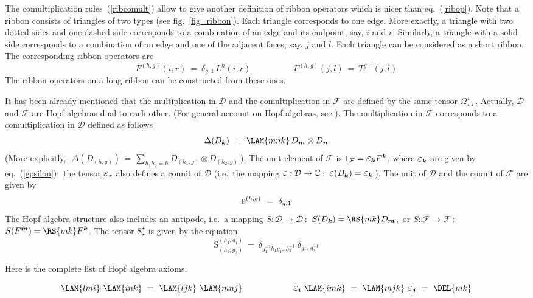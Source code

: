 \documentclass[12pt]{article}
\newcommand{\C}{\mathbb{C}}
\newcommand{\Om}{\Omega}
\newcommand{\Eps}{\mbox{\large$\varepsilon$}}
\newcommand{\rE}{\mbox{\large$\mathrm e$}}
\newcommand{\rS}{\mathrm{S}}
\newcommand{\del}{\delta} %
\newcommand*{\boldind}[1]{{\mbox{\scriptsize\boldmath$#1$}}}
\newcommand*{\RD}[1]{D_\boldind{#1}}
\newcommand*{\RF}[1]{F^\boldind{#1}}
\newcommand*{\EPS}[1]{\Eps_\boldind{#1}}
\newcommand{\calD}{\mathcal{D}}
\newcommand{\calF}{\mathcal{F}}
\begin{document}
The comultiplication rules~(\ref{ribcomult}) allow to give another definition
of ribbon operators which is nicer than eq.~(\ref{ribop}). Note that a ribbon
consists of triangles of two types (see fig.~\ref{fig_ribbon}). Each triangle
corresponds to one edge. More exactly, a triangle with two dotted sides and
one dashed side corresponds to a combination of an edge and its endpoint, say,
$i$ and $r$. Similarly, a triangle with a solid side corresponds to a
combination of an edge and one of the adjacent faces, say, $j$ and
$l$. Each triangle can be considered as a short ribbon. The corresponding
ribbon operators are
\[
  F^{(h,g)}(i,r)\ =\ \del_{g,1}\,L^h(i,r) \qquad\qquad\quad
  F^{(h,g)}(j,l)\ =\ T^{g^{-1}}(j,l)
\]
The ribbon operators on a long ribbon can be constructed from these ones.

It has been already mentioned that the multiplication in $\calD$ and the
comultiplication in $\calF$ are defined by the same tensor
$\Om^{\star}_{\star\star}$. Actually, $\calD$ and $\calF$ are
Hopf algebras dual to each other. (For general account on Hopf algebras, see
\cite{Sw,Maj,Kas}).  The multiplication in $\calF$ corresponds to a 
comultiplication in $\calD$ defined as follows
\begin{equation} \label{loccomult}
  \Delta(\RD{k})\ =\ \LAM{mnk}\,\RD{m}\otimes\RD{n}
\end{equation}
(More explicitly,\,\, 
$\Delta(D_{(h,g)}) \,=\, \sum_{h_1h_2=h} D_{(h_1,g)}\otimes D_{(h_2,g)}\ $).
The unit element of $\calF$ is $1_\calF=\EPS{k}\RF{k}$, where 
$\EPS{k}$ are given by eq.~(\ref{epsilon});\, the tensor
$\Eps_{\star}$ also defines a counit of $\calD$ (i.e.\ the mapping
$\Eps:\calD\to\C$\,:\, $\Eps(\RD{k})=\EPS{k}$\,). The unit
of $\calD$ and the counit of $\calF$ are given by
\begin{equation}
  \rE^{(h,g)}\ =\ \del_{g,1}
\end{equation}
The Hopf algebra structure also includes an antipode, i.e.\ a mapping
$S:\calD\to\calD$\,:\, $S(\RD{k})=\RS{mk}\RD{m}$,\, or
$S:\calF\to\calF$\,:\, $S(\RF{m})=\RS{mk}\RF{k}$. The tensor 
$\rS^{\star}_{\star}$
is given by the equation
\begin{equation}
  \rS^{(h_1,g_1)}_{(h_2,g_2)}\ =\ 
  \del_{g_1^{-1}h_1g_1,\,h_2^{-1}}\ \del_{g_1,\,g_2^{-1}}
\end{equation}

Here is the complete list of Hopf algebra axioms.

\begin{equation} \label{axmult}
  \LAM{lmi}\ \LAM{ink}\ =\ \LAM{ljk}\ \LAM{mnj} \qquad\qquad\qquad
  \EPS{i}\ \LAM{imk}\ =\ \LAM{mjk}\ \EPS{j}\ =\ \DEL{mk}
\end{equation}
\end{document}
